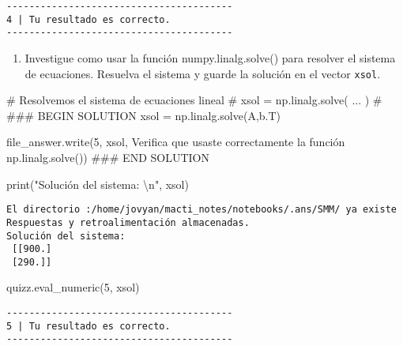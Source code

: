 \documentclass[
  letterpaper,
  DIV=11,
  numbers=noendperiod]{scrreprt}
\newenvironment{Shaded}{\begin{snugshade}}{\end{snugshade}}
\newcommand{\BuiltInTok}[1]{\textcolor[rgb]{0.00,0.23,0.31}{#1}}
\newcommand{\CharTok}[1]{\textcolor[rgb]{0.13,0.47,0.30}{#1}}
\newcommand{\CommentTok}[1]{\textcolor[rgb]{0.37,0.37,0.37}{#1}}
\newcommand{\NormalTok}[1]{\textcolor[rgb]{0.00,0.23,0.31}{#1}}
\newcommand{\OperatorTok}[1]{\textcolor[rgb]{0.37,0.37,0.37}{#1}}
\newcommand{\RegionMarkerTok}[1]{\textcolor[rgb]{0.00,0.23,0.31}{#1}}
\newcommand{\StringTok}[1]{\textcolor[rgb]{0.13,0.47,0.30}{#1}}
\providecommand{\tightlist}{%
  \setlength{\itemsep}{0pt}\setlength{\parskip}{0pt}}\usepackage{longtable,booktabs,array}
\begin{document}
\begin{verbatim}
----------------------------------------
4 | Tu resultado es correcto.
----------------------------------------
\end{verbatim}

\begin{enumerate}
\def\labelenumi{\arabic{enumi}.}
\setcounter{enumi}{1}
\tightlist
\item
  Investigue como usar la función numpy.linalg.solve() para resolver el
  sistema de ecuaciones. Resuelva el sistema y guarde la solución en el
  vector \texttt{xsol}.
\end{enumerate}

\begin{Shaded}
\begin{Highlighting}[]
\CommentTok{\# Resolvemos el sistema de ecuaciones lineal}
\CommentTok{\# xsol = np.linalg.solve( ... )}
\CommentTok{\#}
\CommentTok{\#\#\# }\RegionMarkerTok{BEGIN}\CommentTok{ SOLUTION}
\NormalTok{xsol }\OperatorTok{=}\NormalTok{ np.linalg.solve(A,b.T) }

\NormalTok{file\_answer.write(}\StringTok{\textquotesingle{}5\textquotesingle{}}\NormalTok{, xsol, }\StringTok{\textquotesingle{}Verifica que usaste correctamente la función np.linalg.solve()\textquotesingle{}}\NormalTok{)}
\CommentTok{\#\#\# }\RegionMarkerTok{END}\CommentTok{ SOLUTION}

\BuiltInTok{print}\NormalTok{(}\StringTok{"Solución del sistema: }\CharTok{\textbackslash{}n}\StringTok{"}\NormalTok{, xsol)}
\end{Highlighting}
\end{Shaded}

\begin{verbatim}
El directorio :/home/jovyan/macti_notes/notebooks/.ans/SMM/ ya existe
Respuestas y retroalimentación almacenadas.
Solución del sistema: 
 [[900.]
 [290.]]
\end{verbatim}

\begin{Shaded}
\begin{Highlighting}[]
\NormalTok{quizz.eval\_numeric(}\StringTok{\textquotesingle{}5\textquotesingle{}}\NormalTok{, xsol)}
\end{Highlighting}
\end{Shaded}

\begin{verbatim}
----------------------------------------
5 | Tu resultado es correcto.
----------------------------------------
\end{verbatim}
\end{document}
